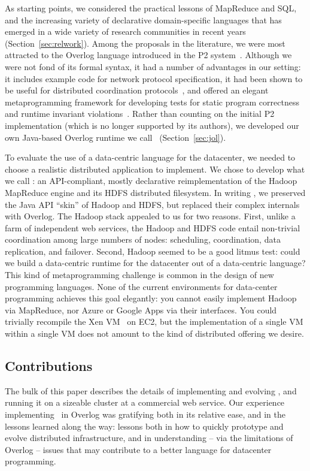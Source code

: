 \documentclass{sig-alternate}
\begin{document}
As starting points, we considered the practical lessons of MapReduce and SQL, and the increasing variety of declarative domain-specific languages that has emerged in a wide variety of research communities in recent years (Section~\ref{sec:relwork}).  
Among the proposals in the literature, we were most attracted to the Overlog language introduced in the P2 system~\cite{p2}.  Although we were not fond of its formal syntax, it had a number of advantages in our setting: it includes example code for network protocol specification, it had been shown to be useful for distributed coordination protocols~\cite{paxonp2}, and offered an elegant metaprogramming framework for developing tests for static program correctness and runtime invariant violations~\cite{evitaraced}.  Rather than counting on the initial P2 implementation (which is no longer supported by its authors), we developed our own Java-based Overlog runtime we call \JOL\ (Section~\ref{sec:jol}).

To evaluate the use of a data-centric language for the datacenter, we needed to choose a realistic distributed application to implement.  We chose to develop what we call {\em \BOOM}: an API-compliant, mostly declarative reimplementation of the Hadoop MapReduce engine and its HDFS distributed filesystem.  In writing \BOOM, we preserved the Java API ``skin'' of Hadoop and HDFS, but replaced their complex internals with Overlog.  The Hadoop stack appealed to us for two reasons.   First, unlike a farm of independent web services, the Hadoop and HDFS code entail non-trivial coordination among large numbers of nodes:  scheduling, coordination, data replication, and failover.  Second, Hadoop seemed to be a good litmus test: could we build a data-centric runtime for the datacenter out of a data-centric language?  This kind of metaprogramming challenge is common in the design of new programming languages. None of the current environments for data-center programming achieves this goal elegantly: you cannot easily implement Hadoop via MapReduce, nor Azure or Google Apps via their interfaces.  You could trivially recompile the Xen VM~\cite{xen} on EC2, but the implementation of a single VM within a single VM does not amount to the kind of distributed offering we desire.

\subsection{Contributions}
The bulk of this paper describes the details of implementing and evolving \BOOM, and running it on a sizeable cluster at a commercial web service.  Our experience implementing \BOOM\ in Overlog was gratifying both in its relative ease, and in the lessons learned along the way: lessons both in how to quickly prototype and evolve distributed infrastructure, and in understanding -- via the limitations of Overlog -- issues that may contribute to a better language for datacenter programming.
\end{document}
